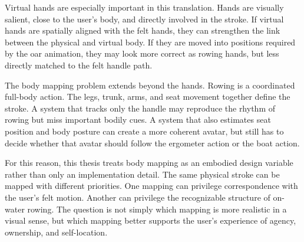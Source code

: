 Virtual hands are especially important in this translation. Hands are visually salient, close to the user's body, and directly involved in the stroke. If virtual hands are spatially aligned with the felt hands, they can strengthen the link between the physical and virtual body. If they are moved into positions required by the oar animation, they may look more correct as rowing hands, but less directly matched to the felt handle path.

The body mapping problem extends beyond the hands. Rowing is a coordinated full-body action. The legs, trunk, arms, and seat movement together define the stroke. A system that tracks only the handle may reproduce the rhythm of rowing but miss important bodily cues. A system that also estimates seat position and body posture can create a more coherent avatar, but still has to decide whether that avatar should follow the ergometer action or the boat action.

For this reason, this thesis treats body mapping as an embodied design variable rather than only an implementation detail. The same physical stroke can be mapped with different priorities. One mapping can privilege correspondence with the user's felt motion. Another can privilege the recognizable structure of on-water rowing. The question is not simply which mapping is more realistic in a visual sense, but which mapping better supports the user's experience of agency, ownership, and self-location.
